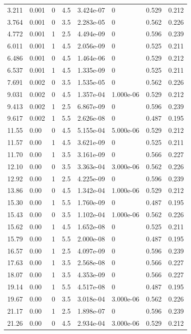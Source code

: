 \documentclass[preview]{standalone}
\begin{document}
{{\begin{tabular}{L{1.2cm}C{1.2cm} C{0.3cm}C{0.5cm} C{1.4cm}C{1.4cm} C{1.4cm}C{1.4cm}}
  3.211  &  0.001  & 0     & 4.5 &  3.424e-07  & 0  & 0.529 &  0.212   \\ 
  3.764  &  0.001  & 0     & 3.5 &  2.283e-05  & 0  & 0.562 &  0.226   \\ 
  4.772  &  0.001  & 1     & 2.5 &  4.494e-09  & 0  & 0.596 &  0.239   \\ 
  6.011  &  0.001  & 1     & 4.5 &  2.056e-09  & 0  & 0.525 &  0.211   \\ 
  6.486  &  0.001  & 0     & 4.5 &  1.464e-06  & 0  & 0.529 &  0.212   \\ 
  6.537  &  0.001  & 1     & 4.5 &  1.335e-09  & 0  & 0.525 &  0.211   \\ 
  7.691  &  0.002  & 0     & 3.5 &  1.535e-05  & 0  & 0.562 &  0.226   \\ 
  9.031  &  0.002  & 0     & 4.5 &  1.357e-04  & 1.000e-06  & 0.529 &  0.212   \\ 
  9.413  &  0.002  & 1     & 2.5 &  6.867e-09  & 0  & 0.596 &  0.239   \\ 
  9.617  &  0.002  & 1     & 5.5 &  2.626e-08  & 0  & 0.487 &  0.195   \\ 
  11.55  &  0.00  & 0     & 4.5 &  5.155e-04  & 5.000e-06  & 0.529 &  0.212   \\ 
  11.57  &  0.00  & 1     & 4.5 &  3.621e-09  & 0  & 0.525 &  0.211   \\ 
  11.70  &  0.00  & 1     & 3.5 &  3.161e-09  & 0  & 0.566 &  0.227   \\ 
  12.10  &  0.00  & 0     & 3.5 &  3.363e-04  & 3.000e-06  & 0.562 &  0.226   \\ 
  12.92  &  0.00  & 1     & 2.5 &  4.225e-09  & 0  & 0.596 &  0.239   \\ 
  13.86  &  0.00  & 0     & 4.5 &  1.342e-04  & 1.000e-06  & 0.529 &  0.212   \\ 
  15.30  &  0.00  & 1     & 5.5 &  1.760e-09  & 0  & 0.487 &  0.195   \\ 
  15.43  &  0.00  & 0     & 3.5 &  1.102e-04  & 1.000e-06  & 0.562 &  0.226   \\ 
  15.62  &  0.00  & 1     & 4.5 &  1.652e-08  & 0  & 0.525 &  0.211   \\ 
  15.79  &  0.00  & 1     & 5.5 &  2.000e-08  & 0  & 0.487 &  0.195   \\ 
  16.57  &  0.00  & 1     & 2.5 &  4.097e-09  & 0  & 0.596 &  0.239   \\ 
  17.63  &  0.00  & 1     & 3.5 &  2.568e-08  & 0  & 0.566 &  0.227   \\ 
  18.07  &  0.00  & 1     & 3.5 &  4.353e-09  & 0  & 0.566 &  0.227   \\ 
  19.14  &  0.00  & 1     & 5.5 &  4.517e-08  & 0  & 0.487 &  0.195   \\ 
  19.67  &  0.00  & 0     & 3.5 &  3.018e-04  & 3.000e-06  & 0.562 &  0.226   \\ 
  21.17  &  0.00  & 1     & 2.5 &  1.898e-07  & 0  & 0.596 &  0.239   \\ 
  21.26  &  0.00  & 0     & 4.5 &  2.934e-04  & 3.000e-06  & 0.529 &  0.212   \\ 
\hline 
\end{tabular} 

}}
\end{document}
